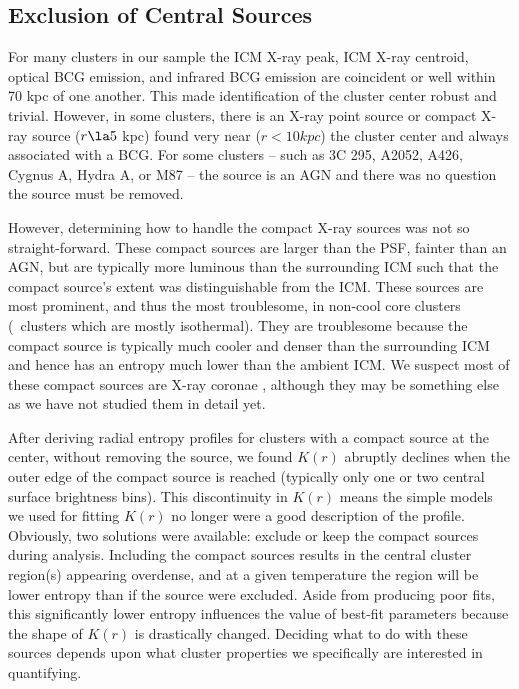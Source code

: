 \documentclass{emulateapj}
\begin{document}
\subsection{Exclusion of Central Sources}
\label{sec:centsrc}

For many clusters in our sample the ICM X-ray peak, ICM X-ray
centroid, optical BCG emission, and infrared BCG emission are
coincident or well within 70 kpc of one another. This made
identification of the cluster center robust and trivial. However, in
some clusters, there is an X-ray point source or compact X-ray source
($r \la 5$ kpc) found very near ($r < 10 kpc$) the cluster center and
always associated with a BCG. For some clusters -- such as 3C 295,
A2052, A426, Cygnus A, Hydra A, or M87 -- the source is an AGN and
there was no question the source must be removed.

However, determining how to handle the compact X-ray sources was not
so straight-forward. These compact sources are larger than the PSF,
fainter than an AGN, but are typically more luminous than the
surrounding ICM such that the compact source's extent was
distinguishable from the ICM. These sources are most prominent, and
thus the most troublesome, in non-cool core clusters (\ie\ clusters
which are mostly isothermal). They are troublesome because the compact
source is typically much cooler and denser than the surrounding ICM
and hence has an entropy much lower than the ambient ICM. We suspect
most of these compact sources are X-ray coronae \citep{coronae},
although they may be something else as we have not studied them in
detail yet.

After deriving radial entropy profiles for clusters with a compact
source at the center, without removing the source, we found $K(r)$
abruptly declines when the outer edge of the compact source is reached
(typically only one or two central surface brightness bins). This
discontinuity in $K(r)$ means the simple models we used for fitting
$K(r)$ no longer were a good description of the profile. Obviously,
two solutions were available: exclude or keep the compact sources
during analysis. Including the compact sources results in the central
cluster region(s) appearing overdense, and at a given temperature the
region will be lower entropy than if the source were excluded. Aside
from producing poor fits, this significantly lower entropy influences
the value of best-fit parameters because the shape of $K(r)$ is
drastically changed. Deciding what to do with these sources depends
upon what cluster properties we specifically are interested in
quantifying.
\end{document}
